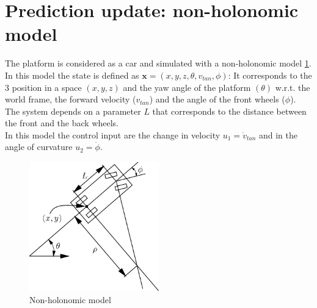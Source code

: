 \section{Prediction update: non-holonomic model}
The platform is considered as a car and simulated with a non-holonomic model \ref{fig:nonholonomicmodel}. In this model the state is defined as $\boldsymbol{x} = (x, y, z,\theta , v_{tan}, \phi)$:
It corresponds to the 3 position in a space $(x,y,z)$ and the yaw angle of the platform $(\theta)$ w.r.t. the world frame, the forward velocity ($v_{tan}$) and the angle of the front wheels ($\phi$). The system depends on a parameter $L$ that corresponds to the distance between the front and the back wheels.\\
In this model the control input are the change in velocity $u_1 = \dot{v}_{tan}$ and in the angle of curvature $u_2 = \dot{\phi}$. \\
\begin{figure}[!ht]
    \centering
    \includegraphics[width=0.5\textwidth]{img/non_holonomic_model.png}
    \caption{Non-holonomic model}
    \label{fig:nonholonomicmodel}
\end{figure}

